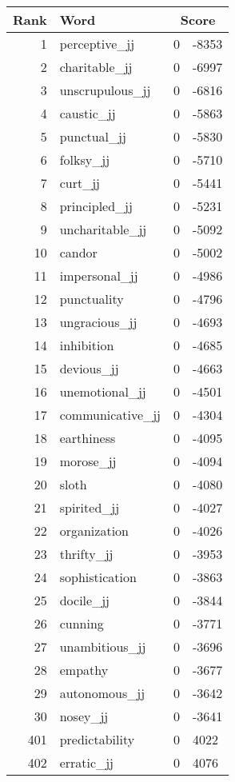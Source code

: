 \begin{longtable}[!htbp]{| rlr@{.}l |}
    \hline
    \textbf{Rank} & \textbf{Word} & \multicolumn{2}{c|}{\textbf{Score}} \\
    \hline
    \endhead
    1 & perceptive\_jj & 0 & -8353 \\
    2 & charitable\_jj & 0 & -6997 \\
    3 & unscrupulous\_jj & 0 & -6816 \\
    4 & caustic\_jj & 0 & -5863 \\
    5 & punctual\_jj & 0 & -5830 \\
    6 & folksy\_jj & 0 & -5710 \\
    7 & curt\_jj & 0 & -5441 \\
    8 & principled\_jj & 0 & -5231 \\
    9 & uncharitable\_jj & 0 & -5092 \\
    10 & candor & 0 & -5002 \\
    11 & impersonal\_jj & 0 & -4986 \\
    12 & punctuality & 0 & -4796 \\
    13 & ungracious\_jj & 0 & -4693 \\
    14 & inhibition & 0 & -4685 \\
    15 & devious\_jj & 0 & -4663 \\
    16 & unemotional\_jj & 0 & -4501 \\
    17 & communicative\_jj & 0 & -4304 \\
    18 & earthiness & 0 & -4095 \\
    19 & morose\_jj & 0 & -4094 \\
    20 & sloth & 0 & -4080 \\
    21 & spirited\_jj & 0 & -4027 \\
    22 & organization & 0 & -4026 \\
    23 & thrifty\_jj & 0 & -3953 \\
    24 & sophistication & 0 & -3863 \\
    25 & docile\_jj & 0 & -3844 \\
    26 & cunning & 0 & -3771 \\
    27 & unambitious\_jj & 0 & -3696 \\
    28 & empathy & 0 & -3677 \\
    29 & autonomous\_jj & 0 & -3642 \\
    30 & nosey\_jj & 0 & -3641 \\
    401 & predictability & 0 & 4022 \\
    402 & erratic\_jj & 0 & 4076 \\

\end{longtable}
